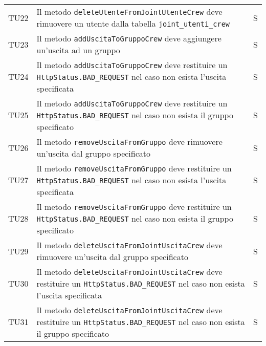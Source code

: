 \begin{center}
{\begin{longtable}{
      |>{\centering\arraybackslash}p{48pt}
      |>{\centering\arraybackslash}p{308pt}
      |>{\centering\arraybackslash}p{27pt}|}
      TU22
                  & Il metodo
      \texttt{deleteUtenteFromJointUtenteCrew} deve rimuovere un utente dalla
      tabella
      \texttt{joint\_utenti\_crew}
                  & S                                              \\
      TU23
                  & Il metodo
      \texttt{addUscitaToGruppoCrew} deve aggiungere un'uscita ad un gruppo
                  & S                                              \\
      TU24
                  & Il metodo
      \texttt{addUscitaToGruppoCrew}	deve restituire un
      \texttt{HttpStatus.BAD\_REQUEST} nel caso non esista l'uscita specificata
                  &
      S
      \\
      TU25
                  & Il metodo
      \texttt{addUscitaToGruppoCrew} deve restituire un
      \texttt{HttpStatus.BAD\_REQUEST} nel caso non esista il gruppo
      specificato &
      S
      \\
      TU26
                  & Il metodo
      \texttt{removeUscitaFromGruppo} deve rimuovere un'uscita dal gruppo
      specificato
                  & S                                              \\
      TU27
                  & Il metodo \texttt{removeUscitaFromGruppo} deve
      restituire un \texttt{HttpStatus.BAD\_REQUEST} nel caso non esista
      l'uscita
      specificata
                  & S                                              \\
      TU28
                  & Il metodo \texttt{removeUscitaFromGruppo} deve
      restituire un \texttt{HttpStatus.BAD\_REQUEST} nel caso non esista il
      gruppo
      specificato
                  & S                                              \\
      TU29
                  & Il metodo
      \texttt{deleteUscitaFromJointUscitaCrew} deve rimuovere un'uscita dal
      gruppo
      specificato
                  & S                                              \\
      TU30
                  & Il metodo
      \texttt{deleteUscitaFromJointUscitaCrew} deve restituire un
      \texttt{HttpStatus.BAD\_REQUEST} nel caso non esista l'uscita specificata
                  & S
      \\
      TU31
                  & Il metodo
      \texttt{deleteUscitaFromJointUscitaCrew} deve restituire un
      \texttt{HttpStatus.BAD\_REQUEST} nel caso non esista il gruppo
      specificato &
      S
      \\

    \end{longtable}
  }
\end{center}
